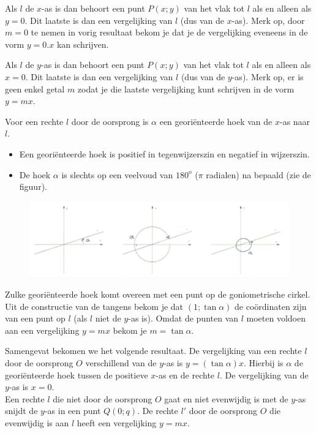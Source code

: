 Als $l$ de $x$-as is dan behoort een punt $P(x;y)$ van het vlak tot $l$ als en alleen als $y=0$.
Dit laatste is dan een vergelijking van $l$ (dus van de $x$-as).
Merk op, door $m=0$ te nemen in vorig resultaat bekom je dat je de vergelijking eveneens in de vorm $y=0.x$ kan schrijven.

Als $l$ de $y$-as is dan behoort een punt $P(x;y)$ van het vlak tot $l$ als en alleen als $x=0$.
Dit laatste is dan een vergelijking van $l$ (dus van de $y$-as).
Merk op, er is geen enkel getal $m$ zodat je die laatste vergelijking kunt schrijven in de vorm $y=mx$.

Voor een rechte $l$ door de oorsprong is $\alpha$ een geori\"enteerde hoek van de $x$-as naar $l$.
\begin{itemize}
\item Een geori\"enteerde hoek is positief in tegenwijzerszin en negatief in wijzerszin.
\item De hoek $\alpha$ is slechts op een veelvoud van $180^o$ ($\pi$ radialen) na bepaald (zie de figuur).
\end{itemize}
\begin{figure}[!htb]
\begin{center}
\includegraphics[height=4 cm]{4_opp_inhoud_an_meetk/inputs/AMtekst4Fig2}
\end{center}
\end{figure}
Zulke geori\"enteerde hoek komt overeen met een punt op de goniometrische cirkel.
Uit de constructie van de tangens bekom je dat $(1; \tan \alpha)$ de co\"ordinaten zijn van een punt op $l$ (als $l$ niet de $y$-as is).
Omdat de punten van $l$ moeten voldoen aan een vergelijking $y=mx$ bekom je $m=\tan \alpha$.

Samengevat bekomen we het volgende resultaat.
De vergelijking van een rechte $l$ door de oorsprong $O$ verschillend van de $y$-as is $y=(\tan \alpha )x$.
Hierbij is $\alpha$ de geori\"enteerde hoek tussen de positieve $x$-as en de rechte $l$.
De vergelijking van de $y$-as is $x=0$.\\

Een rechte $l$ die niet door de oorsprong $O$ gaat en niet evenwijdig is met de $y$-as snijdt de $y$-as in een punt $Q(0;q)$.
De rechte $l'$ door de oorsprong $O$ die evenwijdig is aan $l$ heeft een vergelijking $y=mx$.

